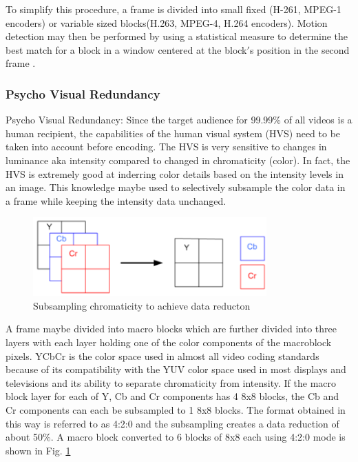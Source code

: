 \documentclass[letterpaper,12pt,titlepage,oneside,final]{report}
\begin{document}
                To simplify this procedure, a frame is divided into small fixed (H-261, MPEG-1 encoders) or variable sized blocks(H.263, MPEG-4, H.264 encoders). Motion detection may then be performed by using a statistical measure to determine the best match for a block in a window centered at the block$'$s position in the second frame \cite{Choupani}.

            \subsubsection{Psycho Visual Redundancy} %
                \label{sub:psv_redundancy}  
                Psycho Visual Redundancy: Since the target audience for 99.99\% of all videos is a human recipient, the capabilities of the human visual system (HVS) need to be taken into account before encoding. The HVS is very sensitive to changes in luminance aka intensity compared to changed in chromaticity (color). In fact, the HVS is extremely good at inderring color details based on the intensity levels in an image. This knowledge maybe used to selectively subsample the color data in a frame while keeping the intensity data unchanged. 

                \begin{figure}[!h]
                    \centering
                    \includegraphics[width=0.8\textwidth]{psychredun}
                    \caption{Subsampling chromaticity to achieve data reducton\cite{Choupani}}
                    \label{psychredun}
                \end{figure}

                A frame maybe divided into macro blocks which are further divided into three layers with each layer holding one of the color components of the macroblock pixels. YCbCr is the color space used in almost all video coding standards because of its compatibility with the YUV color space used in most displays and televisions and its ability to separate chromaticity from intensity. If the macro block layer for each of Y, Cb and Cr components has 4 8x8 blocks, the Cb and Cr components can each be subsampled to 1 8x8 blocks. The format obtained in this way is referred to as 4:2:0 and the subsampling creates a data reduction of about 50\%. A macro block converted to 6 blocks of 8x8 each using 4:2:0 mode is shown in Fig. \ref{psychredun}
\end{document}
